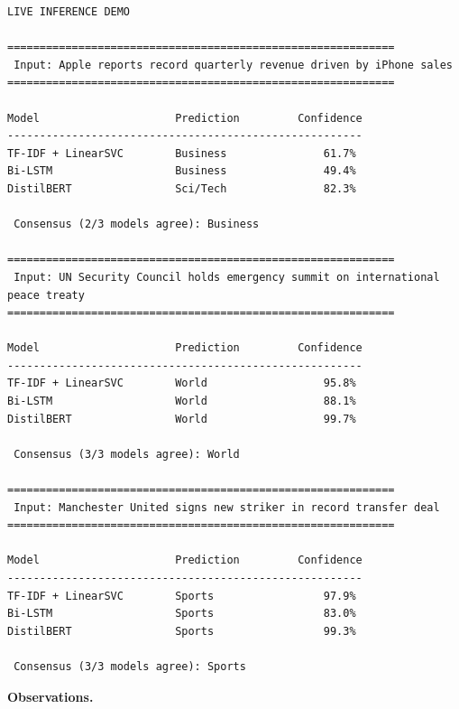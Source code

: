 \documentclass[12pt,a4paper,oneside]{report}
\begin{document}
\begin{Verbatim}[commandchars=\\\{\},breaklines=true,breakanywhere=true,fontsize=\scriptsize,frame=leftline,framesep=2mm,rulecolor=\color{gray}]
 LIVE INFERENCE DEMO

============================================================
 Input: Apple reports record quarterly revenue driven by iPhone sales
============================================================

Model                     Prediction         Confidence
-------------------------------------------------------
TF-IDF + LinearSVC        Business               61.7%
Bi-LSTM                   Business               49.4%
DistilBERT                Sci/Tech               82.3%

 Consensus (2/3 models agree): Business

============================================================
 Input: UN Security Council holds emergency summit on international peace treaty
============================================================

Model                     Prediction         Confidence
-------------------------------------------------------
TF-IDF + LinearSVC        World                  95.8%
Bi-LSTM                   World                  88.1%
DistilBERT                World                  99.7%

 Consensus (3/3 models agree): World

============================================================
 Input: Manchester United signs new striker in record transfer deal
============================================================

Model                     Prediction         Confidence
-------------------------------------------------------
TF-IDF + LinearSVC        Sports                 97.9%
Bi-LSTM                   Sports                 83.0%
DistilBERT                Sports                 99.3%

 Consensus (3/3 models agree): Sports
\end{Verbatim}
\textbf{Observations.}
\end{document}
